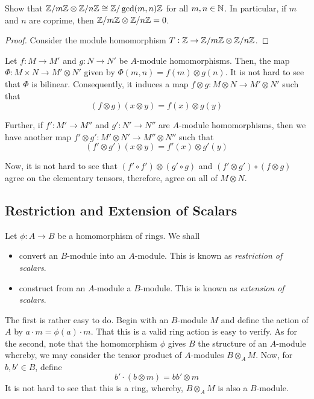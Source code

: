 \begin{example}
    Show that $\mathbb{Z}/m\mathbb{Z}\otimes\mathbb{Z}/n\mathbb{Z}\cong\mathbb{Z}/\gcd(m,n)\mathbb{Z}$ for all $m,n\in\mathbb{N}$. In particular, if $m$ and $n$ are coprime, then $\mathbb{Z}/m\mathbb{Z}\otimes\mathbb{Z}/n\mathbb{Z} = 0$.
\end{example}
\begin{proof}
    Consider the module homomorphism $T:\mathbb{Z}\to\mathbb{Z}/m\mathbb{Z}\otimes\mathbb{Z}/n\mathbb{Z}$. 
\end{proof}

Let $f: M\to M'$ and $g: N\to N'$ be $A$-module homomorphisms. Then, the map $\Phi: M\times N\to M'\otimes N'$ given by $\Phi(m,n) = f(m)\otimes g(n)$. It is not hard to see that $\Phi$ is bilinear. Consequently, it induces a map $f\otimes g: M\otimes N\to M'\otimes N'$ such that 
\begin{equation*}
    (f\otimes g)(x\otimes y) = f(x)\otimes g(y)
\end{equation*}

Further, if $f': M'\to M''$ and $g': N'\to N''$ are $A$-module homomorphisms, then we have another map $f'\otimes g': M'\otimes N'\to M''\otimes N''$ such that 
\begin{equation*}
    (f'\otimes g')(x\otimes y) = f'(x)\otimes g'(y)
\end{equation*}

Now, it is not hard to see that $(f'\circ f')\otimes(g'\circ g)$ and $(f'\otimes g')\circ(f\otimes g)$ agree on the elementary tensors, therefore, agree on all of $M\otimes N$.

\subsection{Restriction and Extension of Scalars}

Let $\phi: A\to B$ be a homomorphism of rings. We shall 
\begin{itemize}
    \item convert an $B$-module into an $A$-module. This is known as \textit{restriction of scalars}.
    \item construct from an $A$-module a $B$-module. This is known as \textit{extension of scalars}.
\end{itemize}

The first is rather easy to do. Begin with an $B$-module $M$ and define the action of $A$ by $a\cdot m = \phi(a)\cdot m$. That this is a valid ring action is easy to verify. As for the second, note that the homomorphism $\phi$ gives $B$ the structure of an $A$-module whereby, we may consider the tensor product of $A$-modules $B\otimes_A M$. Now, for $b,b'\in B$, define 
\begin{equation*}
    b'\cdot(b\otimes m) = bb'\otimes m
\end{equation*}
It is not hard to see that this is a ring, whereby, $B\otimes_A M$ is also a $B$-module.

